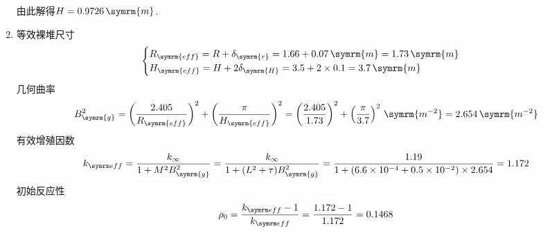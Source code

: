 \begin{exercise}
\begin{solution}
\begin{enumerate}[(1)]
            由此解得$H = 0.9726\,\symrm{m}$.
            \item 等效裸堆尺寸
            \begin{equation*}
                \begin{cases}
                    R_{\symrm{eff}} = R + \delta_{\symrm{r}} = 1.66 + 0.07\,\symrm{m} = 1.73\,\symrm{m} \\
                    H_{\symrm{eff}} = H + 2\delta_{\symrm{H}} = 3.5 + 2 \times 0.1 = 3.7\,\symrm{m}
                \end{cases}
            \end{equation*}
            几何曲率
            \begin{equation*}
                B_{\symrm{g}}^2 = \left(\frac{2.405}{R_{\symrm{eff}}}\right)^2 + \left(\frac{\pi}{H_{\symrm{eff}}}\right)^2 = \left(\frac{2.405}{1.73}\right)^2 + \left(\frac{\pi}{3.7}\right)^2\,\symrm{m^{-2}} = 2.654\,\symrm{m^{-2}}
            \end{equation*}
            有效增殖因数
            \begin{equation*}
                \keff = \frac{k_{\infty}}{1 + M^2 B_{\symrm{g}}^2} = \frac{k_{\infty}}{1 + (L^2 + \tau) B_{\symrm{g}}^2} = \frac{1.19}{1 + (6.6\times 10^{-4} + 0.5\times 10^{-2}) \times 2.654} = 1.172
            \end{equation*}
            初始反应性
            \begin{equation*}
                \rho_0 = \frac{\keff - 1}{\keff} = \frac{1.172 - 1}{1.172} = 0.1468
            \end{equation*}
        \end{enumerate}
    \end{solution}
\end{exercise}

